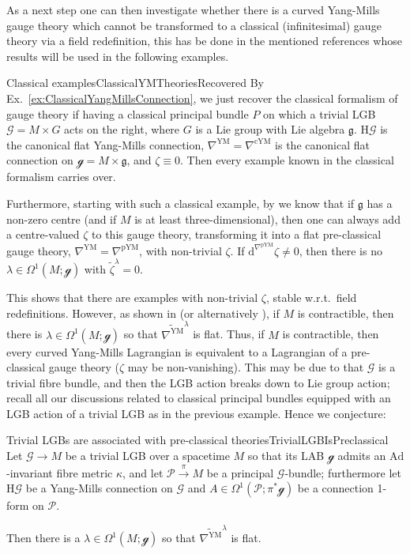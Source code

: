 \documentclass[a4paper,oneside,11pt,bibliography=totoc]{scrartcl}
\theoremstyle{plain}
\theoremstyle{remark}
\theoremstyle{definition}
\begin{document}
As a next step one can then investigate whether there is a curved Yang-Mills gauge theory which cannot be transformed to a classical (infinitesimal) gauge theory via a field redefinition, this has be done in the mentioned references whose results will be used in the following examples.

\begin{examples}{Classical examples}{ClassicalYMTheoriesRecovered}
By Ex.\ \ref{ex:ClassicalYangMillsConnection}, we just recover the classical formalism of gauge theory if having a classical principal bundle $P$ on which a trivial LGB $\mathcal{G} = M \times G$ acts on the right, where $G$ is a Lie group with Lie algebra $\mathfrak{g}$. $\mathrm{H}\mathcal{G}$ is the canonical flat Yang-Mills connection, $\nabla^{\mathrm{YM}}=\nabla^{\mathrm{cYM}}$ is the canonical flat connection on $\mathcal{g} = M \times \mathfrak{g}$, and $\zeta \equiv 0$. Then every example known in the classical formalism carries over.

Furthermore, starting with such a classical example, by \cite[\S 6, Cor.\ 6.2]{My1stpaper} we know that if $\mathfrak{g}$ has a non-zero centre (and if $M$ is at least three-dimensional), then one can always add a centre-valued $\zeta$ to this gauge theory, transforming it into a flat pre-classical gauge theory, $\nabla^{\mathrm{YM}} = \nabla^{\mathrm{pYM}}$, with non-trivial $\zeta$. If $\mathrm{d}^{\nabla^{\mathrm{pYM}}} \zeta \neq 0$, then there is no $\lambda \in \Omega^1(M; \mathcal{g})$ with $\widetilde{\zeta}^\lambda = 0$.
\end{examples}

This shows that there are examples with non-trivial $\zeta$, stable w.r.t.\ field redefinitions. However, as shown in \cite[\S 5.2, Thm.\ 5.16]{My1stpaper} (or alternatively \cite[\S 5.1.5, Thm.\ 5.1.33]{MyThesis}), if $M$ is contractible, then there is $\lambda \in \Omega^1(M; \mathcal{g})$ so that $\widetilde{\nabla^{\mathrm{YM}}}^\lambda$ is flat. Thus, if $M$ is contractible, then every curved Yang-Mills Lagrangian is equivalent to a Lagrangian of a pre-classical gauge theory ($\zeta$ may be non-vanishing). This may be due to that $\mathcal{G}$ is a trivial fibre bundle, and then the LGB action breaks down to Lie group action; recall all our discussions related to classical principal bundles equipped with an LGB action of a trivial LGB as in the previous example. 
Hence we conjecture:

\begin{conjectures}{Trivial LGBs are associated with pre-classical theories}{TrivialLGBIsPreclassical}
Let $\mathcal{G} \to M$ be a trivial LGB over a spacetime $M$ so that its LAB $\mathcal{g}$ admits an $\mathrm{Ad}$-invariant fibre metric $\kappa$, and let $\mathcal{P} \stackrel{\pi}{\to} M$ be a principal $\mathcal{G}$-bundle; furthermore let $\mathrm{H}\mathcal{G}$ be a Yang-Mills connection on $\mathcal{G}$ and $A \in \Omega^1(\mathcal{P}; \pi^*\mathcal{g})$ be a connection 1-form on $\mathcal{P}$.

Then there is a $\lambda \in \Omega^1(M; \mathcal{g})$ so that $\widetilde{\nabla^{\mathrm{YM}}}^\lambda$ is flat.
\end{conjectures}
\end{document}
